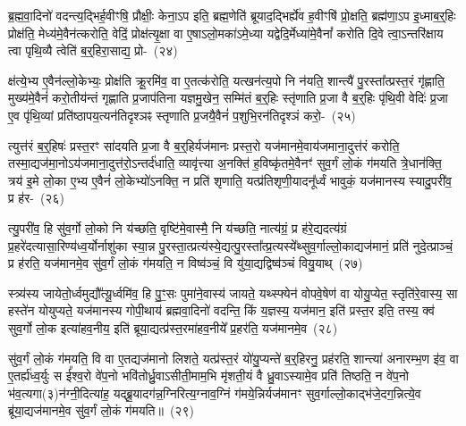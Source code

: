 {\anuvakamend[{भ॒ज॒ति॒ प्र॒जा\-प॑तिनेव॒ वै त्रय॑स्त्रिꣳशच्च}]}

ब्र॒ह्म॒वा॒दिनो॑ वदन्त्य॒द्भिर्\mbox{}ह॒वीꣳषि॒ प्रौक्षीः॒ केना॒\-ऽप इति॒ ब्रह्म॒णेति॑ ब्रूयाद॒द्भिर्\mbox{}ह्ये॑व ह॒वीꣳषि॑ प्रो॒क्षति॒ ब्रह्म॑णा॒\-ऽप इ॒ध्माब॒र्॒\mbox{}हिः प्रोक्ष॑ति॒ मेध्य॑मे॒वैन॑त्करोति॒ वेदिं॒ प्रोक्ष॑त्यृ॒क्षा वा ए॒षा\-ऽलो॒मका॑\-ऽमे॒ध्या यद्वेदि॒र्मेध्या॑मे॒वैनां᳚ करोति दि॒वे त्वा॒\-ऽ\-न्तरि॑क्षाय त्वा पृथि॒व्यै त्वेति॑ ब॒र्॒\mbox{}हिरा॒साद्य॒ प्रो-~(२४)\ip

क्ष॑त्ये॒भ्य ए॒वैन॑ल्लो॒केभ्यः॒ प्रोक्ष॑ति क्रू॒रमि॑व॒ वा ए॒तत्क॑रोति॒ यत्खन॑त्य॒पो नि न॑यति॒ शान्त्यै॑ पु॒रस्ता᳚त्प्रस्त॒रं गृ॑ह्णाति॒ मुख्य॑मे॒वैनं॑ करो॒तीय॑न्तं गृह्णाति प्र॒जा\-प॑तिना यज्ञमु॒खेन॒ सम्मि॑तं ब॒र्॒\mbox{}हिः स्तृ॑णाति प्र॒जा वै ब॒र्॒\mbox{}हिः पृ॑थि॒वी वेदिः॑ प्र॒जा ए॒व पृ॑थि॒व्यां प्रति॑\-ष्ठा\-पय॒त्यन॑ति\-दृश्ञꣴ स्तृणाति प्र॒जयै॒वैनं॑ प॒शुभि॒रन॑तिदृश्ञं करो॒-~(२५)\ip

त्युत्त॑रं ब॒र्॒\mbox{}हिषः॑ प्रस्त॒रꣳ सा॑दयति प्र॒जा वै ब॒र्॒\mbox{}हिर्यज॑मानः प्रस्त॒रो यज॑मानमे॒वा\-य॑जमाना॒दुत्त॑रं करोति॒ तस्मा॒द्यज॑मा॒नो\-ऽय॑जमाना॒दुत्त॑रो॒\-ऽन्तर्द॑धाति॒ व्यावृ॑त्त्या अ॒नक्ति॑ ह॒विष्कृ॑तमे॒वैनꣳ॑ सुव॒र्गं लो॒कं ग॑मयति त्रे॒धान॑क्ति॒ त्रय॑ इ॒मे लो॒का ए॒भ्य ए॒वैनं॑ लो॒केभ्यो॑\-ऽनक्ति॒ न प्रति॑ शृणाति॒ यत्प्र॑तिशृणी॒यादनू᳚र्ध्वं भावुकं॒ यज॑मानस्य स्यादु॒परी॑व॒ प्र ह॑र-~(२६)\ip

त्यु॒परी॑व॒ हि सु॑व॒र्गो लो॒को नि य॑च्छति॒ वृष्टि॑मे॒वास्मै॒ नि य॑च्छति॒ नात्य॑ग्रं॒ प्र ह॑रे॒द्यदत्य॑ग्रं प्र॒हरे॑दत्यासा॒रिण्य॑ध्व॒र्यो\-र्नाशु॑का स्या॒न्न पु॒रस्ता॒त्प्रत्य॑स्ये॒द्यत्पु॒रस्ता᳚त्प्र॒त्यस्ये᳚थ्सुव॒र्गाल्लो॒काद्यज॑\-मानं॒ प्रति॑ नुदे॒त्प्राञ्चं॒ प्र ह॑रति॒ यज॑मानमे॒व सु॑व॒र्गं लो॒कं ग॑मयति॒ न विष्व॑ञ्चं॒ वि यु॑या॒द्यद्विष्व॑ञ्चं वियु॒याथ्~(२७)\ip

स्त्र्य॑स्य जायेतो॒र्ध्वमुद्यौ᳚त्यू॒र्ध्वमि॑व॒ हि पु॒ꣳ॒सः पुमा॑ने॒वास्य॑ जायते॒ यथ्स्फ्येन॑ वोपवे॒षेण॑ वा योयु॒प्येत॒ स्तृति॑रे॒वास्य॒ सा हस्ते॑न योयुप्यते॒ यज॑मानस्य गोपी॒थाय॑ ब्रह्मवा॒दिनो॑ वदन्ति॒ किं य॒ज्ञस्य॒ यज॑मान॒ इति॑ प्रस्त॒र इति॒ तस्य॒ क्व॑ सुव॒र्गो लो॒क इत्या॑हव॒नीय॒ इति॑ ब्रूया॒द्यत्प्र॑स्त॒रमा॑हव॒नीये᳚ प्र॒हर॑ति॒ यज॑मानमे॒व~(२८)\ip

सु॑व॒र्गं लो॒कं ग॑मयति॒ वि वा ए॒तद्यज॑मानो लिशते॒ यत्प्र॑स्त॒रं यो॑यु॒प्यन्ते॑ ब॒र्॒\mbox{}हिरनु॒ प्रह॑रति॒ शान्त्या॑ अनारम्भ॒ण इ॑व॒ वा ए॒तर्\mbox{}ह्य॑ध्व॒र्युः स ई᳚श्व॒रो वे॑प॒नो भवि॑तोर्ध्रु॒वा\-ऽसीती॒माम॒भि मृ॑शती॒यं वै ध्रु॒वा\-ऽस्यामे॒व प्रति॑ तिष्ठति॒ न वे॑प॒नो भ॑व॒त्यगा(३)न॑ग्नी॒दित्या॑ह॒ यद्ब्रू॒यादग॑न्न॒ग्निरित्य॒ग्नाव॒ग्निं ग॑मये॒न्निर्यज॑मानꣳ सुव॒र्गाल्लो॒काद्भ॑जे॒द\-ग॒न्नित्ये॒व ब्रू॑या॒द्यज॑मानमे॒व सु॑व॒र्गं लो॒कं ग॑मयति॥~(२९)\ip

